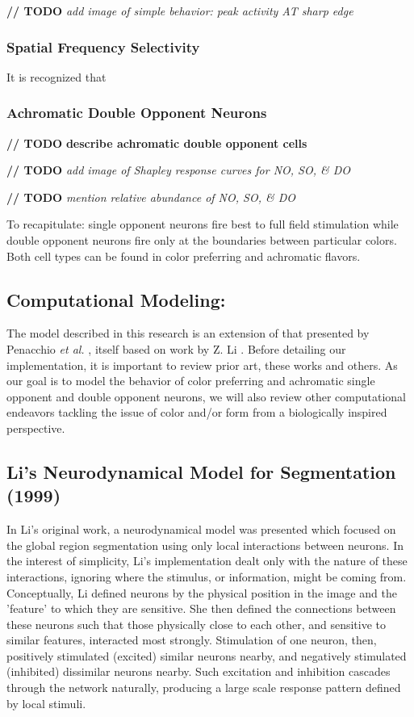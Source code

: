 \documentclass[journal,onecolumn]{IEEEtran}
\begin{document}
\textbf{// TODO} \textit{add image of simple behavior: peak activity AT sharp edge}


\subsubsection*{Spatial Frequency Selectivity}

It is recognized that


\subsubsection*{Achromatic Double Opponent Neurons}

\textbf{// TODO} \textbf{describe achromatic double opponent cells}



\textbf{// TODO} \textit{add image of Shapley response curves for NO, SO, \& DO}

\textbf{// TODO} \textit{mention relative abundance of NO, SO, \& DO}

To recapitulate: single opponent neurons fire best to full field stimulation while double opponent neurons fire only at the boundaries between particular colors. Both cell types can be found in color preferring and achromatic flavors.


\subsection{Computational Modeling:}

The model described in this research is an extension of that presented by Penacchio \textit{et al.} \cite{otazu:plosone}, itself based on work by Z. Li \cite{li:1998, li:1999}. Before detailing our implementation, it is important to review prior art, these works and others. As our goal is to model the behavior of color preferring and achromatic single opponent and double opponent neurons, we will also review other computational endeavors tackling the issue of color and/or form from a biologically inspired perspective.


\subsection*{Li's Neurodynamical Model for Segmentation (1999)}
In Li's original work, a neurodynamical model was presented which focused on the global region segmentation using only local interactions between neurons. In the interest of simplicity, Li's implementation dealt only with the nature of these interactions, ignoring where the stimulus, or information, might be coming from. Conceptually, Li defined neurons by the physical position in the image and the 'feature' to which they are sensitive. She then defined the connections between these neurons such that those physically close to each other, and sensitive to similar features, interacted most strongly. Stimulation of one neuron, then, positively stimulated (excited) similar neurons nearby, and negatively stimulated (inhibited) dissimilar neurons nearby. Such excitation and inhibition cascades through the network naturally, producing a large scale response pattern defined by local stimuli.
\end{document}

